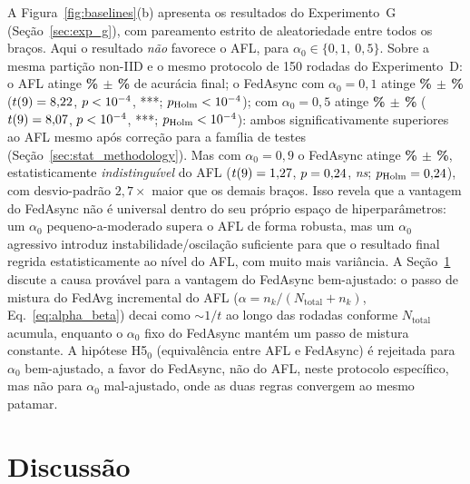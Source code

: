 \documentclass[conference,a4paper]{IEEEtran}
\begin{document}
A Figura~\ref{fig:baselines}(b) apresenta os resultados do Experimento~G
(Seção~\ref{sec:exp_g}), com pareamento estrito de aleatoriedade entre
todos os braços. Aqui o resultado \emph{não} favorece o AFL, para
$\alpha_0 \in \{0{,}1,\ 0{,}5\}$. Sobre a mesma partição non-IID e o mesmo
protocolo de 150 rodadas do Experimento~D: o AFL atinge
\textbf{\statExpGAflAcc\% $\pm$ \statExpGAflAccCI\%} de acurácia final; o FedAsync com
$\alpha_0=0{,}1$ atinge \textbf{\statExpGFedAsyncAccAlphaOne\% $\pm$ \statExpGFedAsyncAccCIAlphaOne\%}
($t(9)=8{,}22$, $p<10^{-4}$, ***;
$p_{\text{Holm}}<10^{-4}$); com $\alpha_0=0{,}5$ atinge
\textbf{\statExpGFedAsyncAccAlphaFive\% $\pm$ \statExpGFedAsyncAccCIAlphaFive\%} ($t(9)=8{,}07$, $p<10^{-4}$, ***;
$p_{\text{Holm}}<10^{-4}$): ambos significativamente
superiores ao AFL mesmo após correção para a família de \statHolmFamilySize{}
testes (Seção~\ref{sec:stat_methodology}). Mas com $\alpha_0=0{,}9$ o
FedAsync atinge \textbf{\statExpGFedAsyncAccAlphaNine\% $\pm$ \statExpGFedAsyncAccCIAlphaNine\%}, estatisticamente
\emph{indistinguível} do AFL ($t(9)=1{,}27$, $p=0{,}24$, \textit{ns};
$p_{\text{Holm}}=0{,}24$),
com desvio-padrão $2{,}7\times$ maior que os demais braços. Isso revela
que a vantagem do FedAsync não é universal dentro do seu próprio espaço de
hiperparâmetros: um $\alpha_0$ pequeno-a-moderado supera o AFL de forma
robusta, mas um $\alpha_0$ agressivo introduz instabilidade/oscilação
suficiente para que o resultado final regrida estatisticamente ao nível do
AFL, com muito mais variância. A Seção~\ref{sec:discussion} discute a
causa provável para a vantagem do FedAsync bem-ajustado: o passo de mistura
do FedAvg incremental do AFL ($\alpha = n_k/(N_{\text{total}}+n_k)$,
Eq.~\ref{eq:alpha_beta}) decai como $\sim\!1/t$ ao longo das rodadas
conforme $N_{\text{total}}$ acumula, enquanto o $\alpha_0$ fixo do FedAsync
mantém um passo de mistura constante. A hipótese H5$_0$ (equivalência entre
AFL e FedAsync) é rejeitada para $\alpha_0$ bem-ajustado, a favor do
FedAsync, não do AFL, neste protocolo específico, mas não para
$\alpha_0$ mal-ajustado, onde as duas regras convergem ao mesmo patamar.

\section{Discussão}
\label{sec:discussion}
\end{document}
